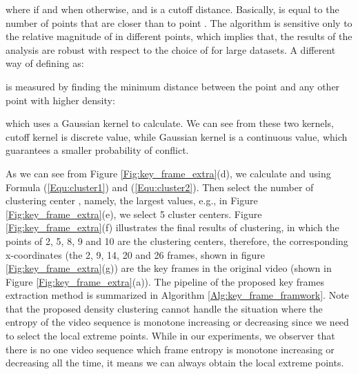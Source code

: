 \documentclass[5p]{elsarticle}
\begin{document}
where  if  and  when otherwise, and  is a cutoff distance.
Basically,  is equal to the number of points that are closer than  to point .
The algorithm is sensitive only to the relative magnitude of  in different points, which implies that, the results of the analysis are robust with respect to the choice of  for large datasets.
A different way of defining  as:


 is measured by finding the minimum distance between the point  and any other point with higher density:

which uses a Gaussian kernel to calculate.
We can see from these two kernels, cutoff kernel is discrete value, while Gaussian kernel is a continuous value, which guarantees a smaller probability of conflict.

As we can see from  Figure \ref{Fig:key_frame_extra}(d), we calculate  and  using Formula (\ref{Equ:cluster1}) and (\ref{Equ:cluster2}).
Then select the number of clustering center , namely, the  largest  values, e.g., in Figure \ref{Fig:key_frame_extra}(e), we select 5 cluster centers.
Figure \ref{Fig:key_frame_extra}(f) illustrates the final results of clustering, in which the points of 2, 5, 8, 9 and 10 are the clustering centers, therefore, the corresponding x-coordinates (the 2, 9, 14, 20 and 26 frames, shown in figure \ref{Fig:key_frame_extra}(g)) are the key frames  in the original video  (shown in Figure \ref{Fig:key_frame_extra}(a)).
The pipeline of the proposed key frames extraction method is summarized in Algorithm \ref{Alg:key_frame_framwork}.
Note that the proposed density clustering cannot handle the situation where the entropy of the video sequence is monotone increasing or decreasing since we need to select the local extreme points.
While in our experiments, we observer that there is no one video sequence which frame entropy is monotone increasing or decreasing all the time, it means we can always obtain the local extreme points.
\end{document}
